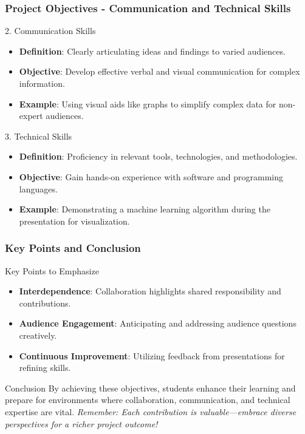 \documentclass[aspectratio=169]{beamer}
\begin{document}
\begin{frame}[fragile]
    \frametitle{Project Objectives - Communication and Technical Skills}
    \begin{block}{2. Communication Skills}
        \begin{itemize}
            \item \textbf{Definition}: Clearly articulating ideas and findings to varied audiences.
            \item \textbf{Objective}: Develop effective verbal and visual communication for complex information.
            \item \textbf{Example}: Using visual aids like graphs to simplify complex data for non-expert audiences.
        \end{itemize}
    \end{block}

    \begin{block}{3. Technical Skills}
        \begin{itemize}
            \item \textbf{Definition}: Proficiency in relevant tools, technologies, and methodologies.
            \item \textbf{Objective}: Gain hands-on experience with software and programming languages.
            \item \textbf{Example}: Demonstrating a machine learning algorithm during the presentation for visualization.
        \end{itemize}
    \end{block}
\end{frame}

\begin{frame}[fragile]
    \frametitle{Key Points and Conclusion}
    \begin{block}{Key Points to Emphasize}
        \begin{itemize}
            \item \textbf{Interdependence}: Collaboration highlights shared responsibility and contributions.
            \item \textbf{Audience Engagement}: Anticipating and addressing audience questions creatively.
            \item \textbf{Continuous Improvement}: Utilizing feedback from presentations for refining skills.
        \end{itemize}
    \end{block}
    
    \begin{block}{Conclusion}
        By achieving these objectives, students enhance their learning and prepare for environments where collaboration, communication, and technical expertise are vital.
        \textit{Remember: Each contribution is valuable—embrace diverse perspectives for a richer project outcome!}
    \end{block}
\end{frame}
\end{document}
